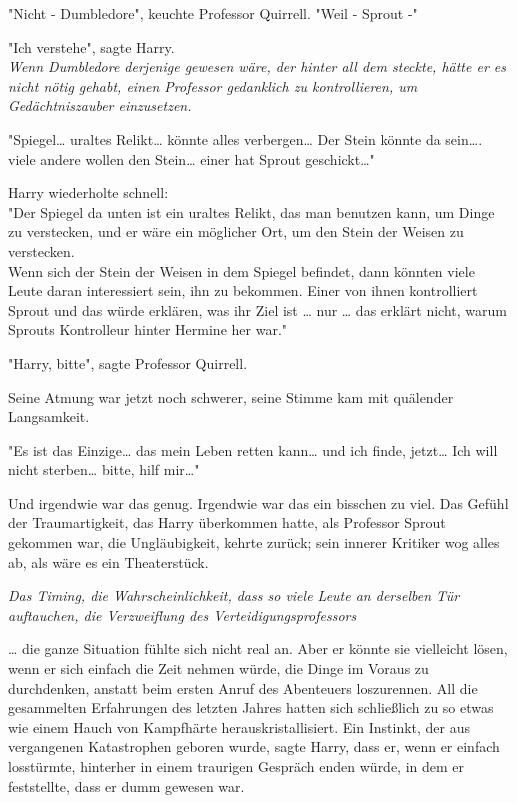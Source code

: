 {"Nicht - Dumbledore", keuchte Professor Quirrell. "Weil - Sprout -"

"Ich verstehe", sagte Harry.\\ \emph{Wenn Dumbledore derjenige gewesen wäre, der hinter all dem steckte, hätte er es nicht nötig gehabt, einen Professor gedanklich zu kontrollieren, um Gedächtniszauber einzusetzen.}

"Spiegel… uraltes Relikt… könnte alles verbergen… Der Stein könnte da sein…. viele andere wollen den Stein… einer hat Sprout geschickt…"

Harry wiederholte schnell:\\ "Der Spiegel da unten ist ein uraltes Relikt, das man benutzen kann, um Dinge zu verstecken, und er wäre ein möglicher Ort, um den Stein der Weisen zu verstecken.\\ Wenn sich der Stein der Weisen in dem Spiegel befindet, dann könnten viele Leute daran interessiert sein, ihn zu bekommen. Einer von ihnen kontrolliert Sprout und das würde erklären, was ihr Ziel ist … nur … das erklärt nicht, warum Sprouts Kontrolleur hinter Hermine her war."

"Harry, bitte", sagte Professor Quirrell.

Seine Atmung war jetzt noch schwerer, seine Stimme kam mit quälender Langsamkeit.

"Es ist das Einzige… das mein Leben retten kann… und ich finde, jetzt… Ich will nicht sterben… bitte, hilf mir…"

Und irgendwie war das genug. Irgendwie war das ein bisschen zu viel. Das Gefühl der Traumartigkeit, das Harry überkommen hatte, als Professor Sprout gekommen war, die Ungläubigkeit, kehrte zurück; sein innerer Kritiker wog alles ab, als wäre es ein Theaterstück.

\emph{Das Timing, die Wahrscheinlichkeit, dass so viele Leute an derselben Tür auftauchen, die Verzweiflung des Verteidigungsprofessors}

… die ganze Situation fühlte sich nicht real an. Aber er könnte sie vielleicht lösen, wenn er sich einfach die Zeit nehmen würde, die Dinge im Voraus zu durchdenken, anstatt beim ersten Anruf des Abenteuers loszurennen. All die gesammelten Erfahrungen des letzten Jahres hatten sich schließlich zu so etwas wie einem Hauch von Kampfhärte herauskristallisiert. Ein Instinkt, der aus vergangenen Katastrophen geboren wurde, sagte Harry, dass er, wenn er einfach losstürmte, hinterher in einem traurigen Gespräch enden würde, in dem er feststellte, dass er dumm gewesen war.

}
